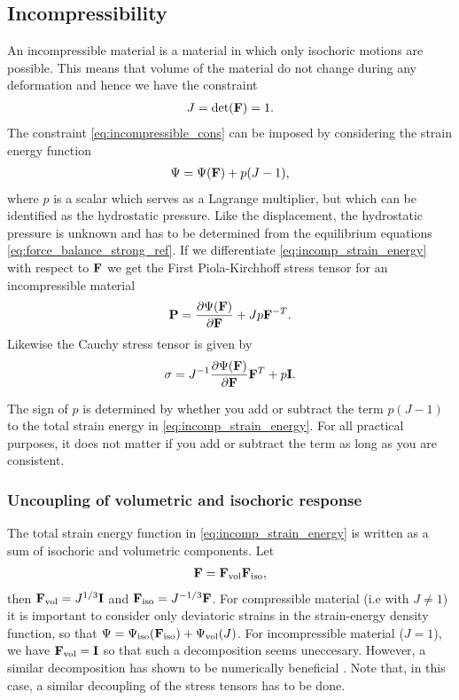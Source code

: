 \subsection{Incompressibility}
\label{sec:incompressibility}
An incompressible material is a material in which only isochoric
motions are possible. This means that volume of the material do not
change during any deformation and hence we have the constraint
\begin{align}
  J = \det(\mathbf{F}) = 1.
  \label{eq:incompressible_cons}
\end{align}
The constraint \eqref{eq:incompressible_cons} can be imposed by considering the strain energy
function
\begin{align}
  \Psi = \Psi(\mathbf{F}) + p(J-1),
  \label{eq:incomp_strain_energy}
\end{align}
where $p$ is a scalar which serves as a Lagrange multiplier, but which
can be identified as the hydrostatic pressure. Like the displacement,
the hydrostatic pressure is unknown and has to be determined from the equilibrium
equations \eqref{eq:force_balance_strong_ref}. If we differentiate
\eqref{eq:incomp_strain_energy} with respect to $\mathbf{F}$ we get the First
Piola-Kirchhoff stress tensor for an incompressible material
\begin{align}
  \mathbf{P} = \frac{\partial \Psi(\mathbf{F})}{\partial \mathbf{F}} + J p \mathbf{F}^{-T}.
\end{align}
Likewise the Cauchy stress tensor is given by
\begin{align}
  \mathbf{\sigma} = J^{-1} \frac{\partial \Psi(\mathbf{F})}{\partial \mathbf{F}}\mathbf{F}^{T} + p \mathbf{I}.
  \label{eq:cauchy_incomp}
\end{align}


\begin{remark}
  The sign of $p$ is determined by whether you add or subtract the term
  $ p(J-1)$ to the total strain energy in
  \eqref{eq:incomp_strain_energy}. For all practical purposes, it
  does not matter if you add or subtract the term as long as you are
  consistent. 
\end{remark}


\subsubsection{Uncoupling of volumetric and isochoric response}
The total strain energy function in \eqref{eq:incomp_strain_energy}
is written as a sum of isochoric and volumetric components. Let
\begin{align}
  \mathbf{F} =  \mathbf{F}_{\mathrm{vol}} \mathbf{F}_{\mathrm{iso}},
\end{align}
then $ \mathbf{F}_{\mathrm{vol}} =
J^{1/3}\mathbf{I}$ and $\mathbf{F}_{\mathrm{iso}} = J^{-1/3}\mathbf{F}$. For
compressible material (i.e with $J \neq 1$) it is important to consider
only deviatoric strains in the strain-energy density function, so that
$\Psi = \Psi_{\mathrm{iso}}(\mathbf{F}_{\mathrm{iso}}) +
\Psi_{\mathrm{vol}}(J)$. For incompressible material ($J = 1$), we
have $\mathbf{F}_{\mathrm{vol}} = \mathbf{I}$ so that such a decomposition seems
uneccesary. However, a similar decomposition has shown to be
numerically beneficial \cite{weiss1996finite}. Note that, in this case, a similar
decoupling of the stress tensors has to be done.

